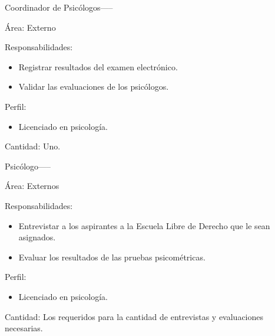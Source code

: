\begin{actor}{Coordinador de Psicólogos}{-----}
	
	\item[Área:] Externo
	
	\item[Responsabilidades:] \hspace{1pt}
	
	\begin{itemize}
		\item Registrar resultados del examen electrónico.
		\item Validar las evaluaciones de los psicólogos.
	\end{itemize}
	\item[Perfil:] \hspace{1pt}
	\begin{itemize}
		\item Licenciado en psicología.
	\end{itemize}
	\item[Cantidad:] Uno.
\end{actor}


\begin{actor}{Psicólogo}{-----}
	
	\item[Área:] Externos
	
	\item[Responsabilidades:] \hspace{1pt}
	
	\begin{itemize}
		\item Entrevistar a los aspirantes a la Escuela Libre de Derecho que le sean asignados.
		\item Evaluar los resultados de las pruebas psicométricas.
	\end{itemize}
	\item[Perfil:] \hspace{1pt}
	\begin{itemize}
		\item Licenciado en psicología.
	\end{itemize}
	\item[Cantidad:] Los requeridos para la cantidad de entrevistas y evaluaciones necesarias.
\end{actor}


